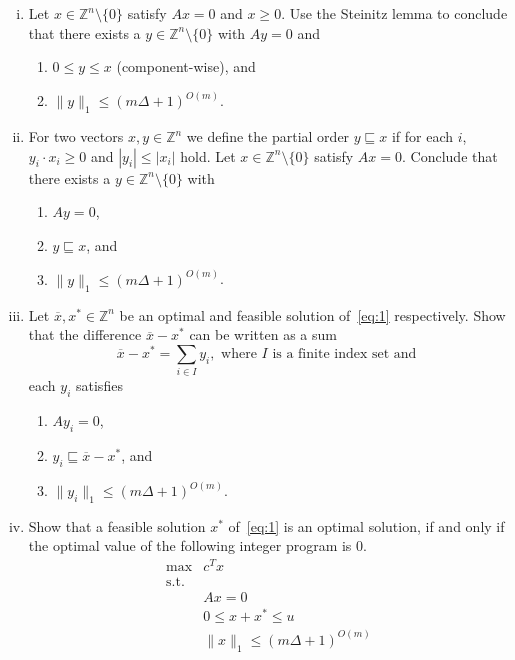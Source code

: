 \documentclass[11pt,a4paper]{article}
\newcommand{\wb}[1]{\overline{#1}}
\begin{document}
\begin{enumerate}[i)]
\item Let $x ∈ℤ^n \setminus \{0\}$ satisfy $A x = 0$ and $x≥0$.  Use the Steinitz lemma to conclude that there exists a $y  ∈ℤ^n \setminus \{0\}$ with
  $A y = 0$ and 
  \begin{enumerate}[1)]
  \item  $0≤ y ≤ x$ (component-wise), and
  \item $\|y\|_1 ≤ (mΔ+1)^{O(m)}$.  
  \end{enumerate}
\item \label{item:4} 
  For two vectors $x,y ∈ℤ^n$ we define the partial order $y \sqsubseteq x$ if for each $i$, $y_i ⋅x_i ≥ 0$ and $|y_i| ≤ |x_i|$ hold. Let $x ∈ℤ^n \setminus \{0\}$ satisfy $A x = 0$. Conclude that there exists a  $y   ∈ℤ^n \setminus \{0\}$ with
  \begin{enumerate}[1)]
  \item  $A y = 0$, \label{item:1}
  \item  $ y \sqsubseteq  x$, and \label{item:2}
  \item $\|y\|_1 ≤ (mΔ+1)^{O(m)}$.   \label{item:3}
  \end{enumerate}

\item Let $\wb{x},x^* ∈ℤ^n$  be an optimal  and feasible solution of~\eqref{eq:1} respectively. Show that the difference $\wb{x}-x^*$ can be written as a sum
  \begin{displaymath}
    \wb{x}-x^* = ∑_{i ∈I} y_i, \text{ where } I \text{ is a finite index set and }  
  \end{displaymath}
  each $y_i$ satisfies \label{item:6}
  \begin{enumerate}[1)]
  \item  $A y_i = 0$, \label{item:1}
  \item  $ y_i \sqsubseteq  \wb{x}-x^*$, and \label{item:2}
  \item $\|y_i\|_1 ≤ (mΔ+1)^{O(m)}$.   \label{item:3} 
  \end{enumerate}


\item Show that a feasible solution $x^*$ of~\eqref{eq:1} is an optimal solution, if and only if the optimal value of the following integer program is $0$.
  \begin{displaymath}
    \begin{array}{ll}
      \max & c^T x  \\ 
      \mathrm{s.t.} & \\
           & A x = 0 \\
           & 0 ≤ x + x^* ≤ u \\
           & \|x\|_1 ≤ (mΔ +1)^{O(m)} 
    \end{array}
  \end{displaymath} \label{item:5}


\end{enumerate}
\end{document}
